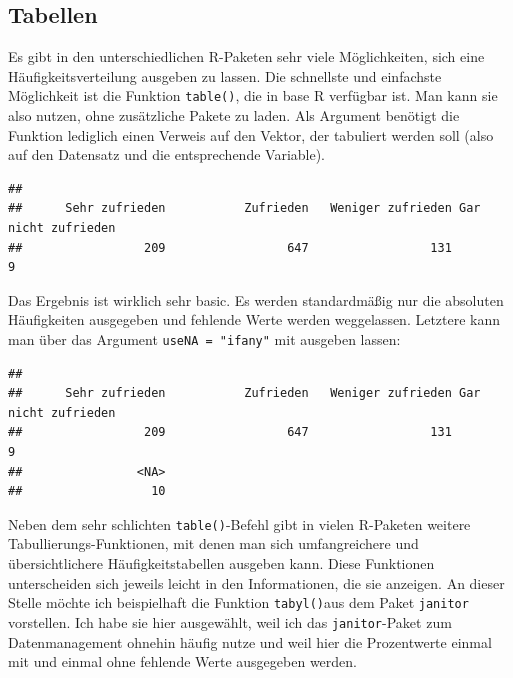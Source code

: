 \documentclass[
]{book}
\newenvironment{Shaded}{\begin{snugshade}}{\end{snugshade}}
\newcommand{\AttributeTok}[1]{\textcolor[rgb]{0.77,0.63,0.00}{#1}}
\newcommand{\CommentTok}[1]{\textcolor[rgb]{0.56,0.35,0.01}{\textit{#1}}}
\newcommand{\FunctionTok}[1]{\textcolor[rgb]{0.00,0.00,0.00}{#1}}
\newcommand{\NormalTok}[1]{#1}
\newcommand{\SpecialCharTok}[1]{\textcolor[rgb]{0.00,0.00,0.00}{#1}}
\newcommand{\StringTok}[1]{\textcolor[rgb]{0.31,0.60,0.02}{#1}}
\begin{document}
\hypertarget{tabellen}{%
\subsection{Tabellen}\label{tabellen}}

Es gibt in den unterschiedlichen R-Paketen sehr viele Möglichkeiten, sich eine Häufigkeitsverteilung ausgeben zu lassen. Die schnellste und einfachste Möglichkeit ist die Funktion \texttt{table()}, die in base R verfügbar ist. Man kann sie also nutzen, ohne zusätzliche Pakete zu laden. Als Argument benötigt die Funktion lediglich einen Verweis auf den Vektor, der tabuliert werden soll (also auf den Datensatz und die entsprechende Variable).

\begin{Shaded}
\end{Shaded}

\begin{verbatim}
## 
##      Sehr zufrieden           Zufrieden   Weniger zufrieden Gar nicht zufrieden 
##                 209                 647                 131                   9
\end{verbatim}

Das Ergebnis ist wirklich sehr basic. Es werden standardmäßig nur die absoluten Häufigkeiten ausgegeben und fehlende Werte werden weggelassen. Letztere kann man über das Argument \texttt{useNA\ =\ "ifany"} mit ausgeben lassen:

\begin{Shaded}
\end{Shaded}

\begin{verbatim}
## 
##      Sehr zufrieden           Zufrieden   Weniger zufrieden Gar nicht zufrieden 
##                 209                 647                 131                   9 
##                <NA> 
##                  10
\end{verbatim}

Neben dem sehr schlichten \texttt{table()}-Befehl gibt in vielen R-Paketen weitere Tabullierungs-Funktionen, mit denen man sich umfangreichere und übersichtlichere Häufigkeitstabellen ausgeben kann. Diese Funktionen unterscheiden sich jeweils leicht in den Informationen, die sie anzeigen. An dieser Stelle möchte ich beispielhaft die Funktion \texttt{tabyl()}aus dem Paket \texttt{janitor} vorstellen. Ich habe sie hier ausgewählt, weil ich das \texttt{janitor}-Paket zum Datenmanagement ohnehin häufig nutze und weil hier die Prozentwerte einmal mit und einmal ohne fehlende Werte ausgegeben werden.
\end{document}
